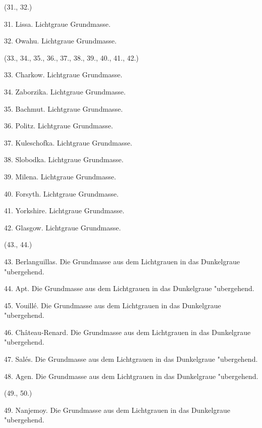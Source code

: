 \documentclass[a4paper, 11pt, oneside, polutonikogreek, german]{article}
\begin{document}
\vspace{2ex}

\begin{center}
(31., 32.)
\end{center}

31. Lissa. Lichtgraue Grundmasse.

32. Owahu. Lichtgraue Grundmasse.

\begin{center}
(33., 34., 35., 36., 37., 38., 39., 40., 41., 42.)
\end{center}

33. Charkow. Lichtgraue Grundmasse.

34. Zaborzika. Lichtgraue Grundmasse.

35. Bachmut. Lichtgraue Grundmasse.

36. Politz. Lichtgraue Grundmasse.

37. Kuleschofka. Lichtgraue Grundmasse.

38. Slobodka. Lichtgraue Grundmasse.

39. Milena. Lichtgraue Grundmasse.

40. Forsyth. Lichtgraue Grundmasse.

41. Yorkshire. Lichtgraue Grundmasse.

42. Glasgow. Lichtgraue Grundmasse.

\begin{center}
(43., 44.)
\end{center}

43. Berlanguillas. Die Grundmasse aus dem Lichtgrauen in das Dunkelgraue "ubergehend.

44. Apt. Die Grundmasse aus dem Lichtgrauen in das Dunkelgraue "ubergehend.

\vspace{2ex}

45. Vouillé. Die Grundmasse aus dem Lichtgrauen in das Dunkelgraue "ubergehend.

46. Château-Renard. Die Grundmasse aus dem Lichtgrauen in das Dunkelgraue "ubergehend.

47. Salés. Die Grundmasse aus dem Lichtgrauen in das Dunkelgraue "ubergehend.

48. Agen. Die Grundmasse aus dem Lichtgrauen in das Dunkelgraue "ubergehend.

\begin{center}
(49., 50.)
\end{center}

49. Nanjemoy. Die Grundmasse aus dem Lichtgrauen in das Dunkelgraue "ubergehend.
\end{document}
